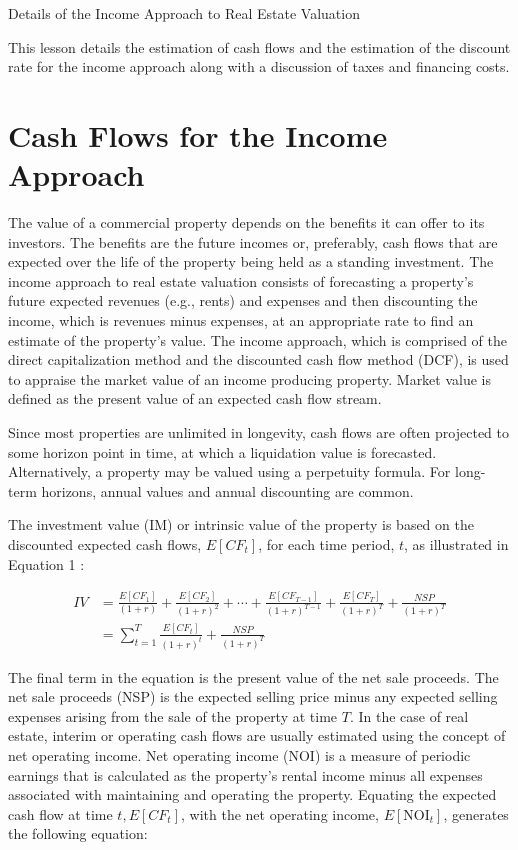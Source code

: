 \documentclass[11pt]{article}
\begin{document}
Details of the Income Approach to Real Estate Valuation

This lesson details the estimation of cash flows and the estimation of the discount rate for the income approach along with a discussion of taxes and financing costs.

\section*{Cash Flows for the Income Approach}
The value of a commercial property depends on the benefits it can offer to its investors. The benefits are the future incomes or, preferably, cash flows that are expected over the life of the property being held as a standing investment. The income approach to real estate valuation consists of forecasting a property's future expected revenues (e.g., rents) and expenses and then discounting the income, which is revenues minus expenses, at an appropriate rate to find an estimate of the property's value. The income approach, which is comprised of the direct capitalization method and the discounted cash flow method (DCF), is used to appraise the market value of an income producing property. Market value is defined as the present value of an expected cash flow stream.

Since most properties are unlimited in longevity, cash flows are often projected to some horizon point in time, at which a liquidation value is forecasted. Alternatively, a property may be valued using a perpetuity formula. For long-term horizons, annual values and annual discounting are common.

The investment value (IM) or intrinsic value of the property is based on the discounted expected cash flows, $E\left[C F_{t}\right]$, for each time period, $t$, as illustrated in Equation 1 :


\begin{align*}
I V & =\frac{E\left[C F_{1}\right]}{(1+r)}+\frac{E\left[C F_{2}\right]}{(1+r)^{2}}+\cdots+\frac{E\left[C F_{T-1}\right]}{(1+r)^{T-1}}+\frac{E\left[C F_{T}\right]}{(1+r)^{T}}+\frac{N S P}{(1+r)^{T}} \\
& =\sum_{t=1}^{T} \frac{E\left[C F_{t}\right]}{(1+r)^{t}}+\frac{N S P}{(1+r)^{T}} \tag{1}
\end{align*}


The final term in the equation is the present value of the net sale proceeds. The net sale proceeds (NSP) is the expected selling price minus any expected selling expenses arising from the sale of the property at time $T$. In the case of real estate, interim or operating cash flows are usually estimated using the concept of net operating income. Net operating income (NOI) is a measure of periodic earnings that is calculated as the property's rental income minus all expenses associated with maintaining and operating the property. Equating the expected cash flow at time $t, E\left[C F_{t}\right]$, with the net operating income, $E\left[\mathrm{NOI}_{t}\right]$, generates the following equation:
\end{document}
